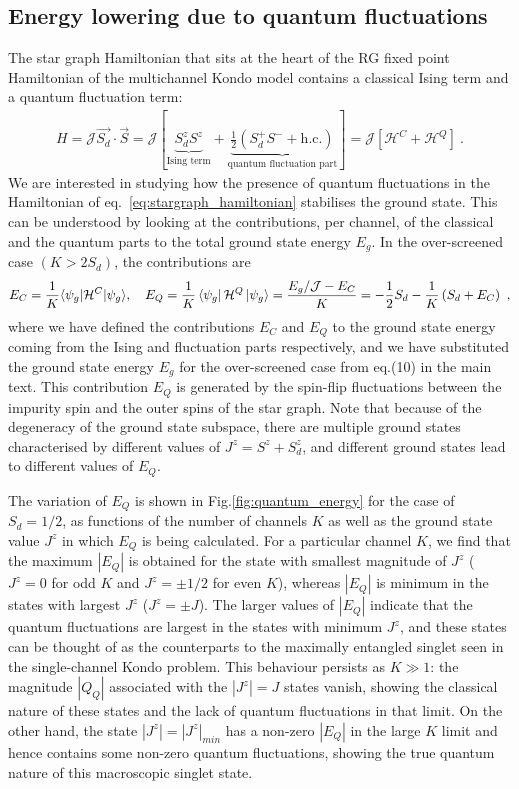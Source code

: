 \documentclass[12pt]{iopart}
\begin{document}
\subsection{Energy lowering due to quantum fluctuations}
The star graph Hamiltonian that sits at the heart of the RG fixed point Hamiltonian of the multichannel Kondo model contains a classical Ising term and a quantum fluctuation term:
\begin{eqnarray}
	H = {\mathcal{J}}\vec{S_d}\cdot\vec S = \mathcal{J}\left[\underbrace{S_d^z S^z}_\text{Ising term} + \underbrace{\frac{1}{2}\left(S_d^+ S^- + \text{h.c.}\right)}_\text{quantum fluctuation part} \right] = \mathcal{J}\left[\mathcal{H}^C + \mathcal{H}^Q\right] ~.
	\label{eq:stargraph_hamiltonian}
\end{eqnarray}
We are interested in studying how the presence of quantum fluctuations in the Hamiltonian of eq.~\ref{eq:stargraph_hamiltonian} stabilises the ground state. This can be understood by looking at the contributions, per channel, of the classical and the quantum parts to the total ground state energy \(E_g\). In the over-screened case \(\left( K > 2S_d \right) \), the contributions are
\begin{eqnarray}
	E_{C} = \frac{1}{K}\langle \psi_g | \mathcal{H}^C | \psi_g \rangle, \quad E_{Q} = \frac{1}{K}\bra{\psi_g}\mathcal{H}^Q \ket{\psi_g} =\frac{E_g/\mathcal{J} - E_{C}}{K} =  -\frac{1}{2}S_d - \frac{1}{K}\left(S_d + E_{C}\right)~,
\end{eqnarray}  
where we have defined the contributions \(E_C\) and \(E_Q\) to the ground state energy coming from the Ising and fluctuation parts respectively, and we have substituted the ground state energy \(E_g\) for the over-screened case from eq.(10) in the main text. This contribution $E_Q$ is generated by the spin-flip fluctuations between the impurity spin and the outer spins of the star graph. Note that because of the degeneracy of the ground state subspace, there are multiple ground states characterised by different values of \(J^z = S^z + S_d^z\), and different ground states lead to different values of \(E_Q\).

The variation of \(E_Q\) is shown in Fig.\ref{fig:quantum_energy} for the case of $S_d=1/2$, as functions of the number of channels \(K\) as well as the ground state value \(J^z\) in which \(E_Q\) is being calculated. For a particular channel $K$, we find that the maximum \(|E_Q|\) is obtained for the state with smallest magnitude of $J^z$ (\(J^z = 0 \) for odd \(K\) and \(J^z = \pm 1/2\) for even \(K\)), whereas \(|E_Q|\) is minimum in the states with largest \(J^z\) ($J^z=\pm J$). The larger values of \(|E_Q|\) indicate that the quantum fluctuations are largest in the states with minimum \(J^z\), and these states can be thought of as the counterparts to the maximally entangled singlet seen in the single-channel Kondo problem. This behaviour persists as \(K \gg 1\): the magnitude \(|Q_Q|\) associated with the $|J^z|= J$ states vanish, showing the classical nature of these states and the lack of quantum fluctuations in that limit. On the other hand, the state $|J^z| = |J^z|_{min}$ has a non-zero \(|E_Q|\) in the large \(K\) limit and hence contains some non-zero quantum fluctuations, showing the true quantum nature of this macroscopic singlet state.
\end{document}
